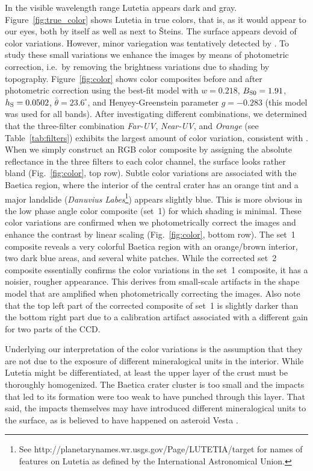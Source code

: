 \documentclass[3p,authoryear]{elsarticle}
\begin{document}
In the visible wavelength range Lutetia appears dark and gray. Figure~\ref{fig:true_color} shows Lutetia in true colors, that is, as it would appear to our eyes, both by itself as well as next to {\v S}teins. The surface appears devoid of color variations. However, minor variegation was tentatively detected by \citet{Mg12}. To study these small variations we enhance the images by means of photometric correction, i.e.\ by removing the brightness variations due to shading by topography. Figure~\ref{fig:color} shows color composites before and after photometric correction using the best-fit \citet{H02} model with $w = 0.218$, $B_{{\rm S}0} = 1.91$, $h_{\rm S} = 0.0502$, $\bar{\theta} = 23.6^\circ$, and Henyey-Greenstein parameter $g = -0.283$ (this model was used for all bands). After investigating different combinations, we determined that the three-filter combination {\it Far-UV}, {\it Near-UV}, and {\it Orange} (see Table~\ref{tab:filters}) exhibits the largest amount of color variation, consistent with \citet{Mg12}. When we simply construct an RGB color composite by assigning the absolute reflectance in the three filters to each color channel, the surface looks rather bland (Fig.~\ref{fig:color}, top row). Subtle color variations are associated with the Baetica region, where the interior of the central crater has an orange tint and a major landslide ({\it Danuvius Labes}\footnote{See http://planetarynames.wr.usgs.gov/Page/LUTETIA/target for names of features on Lutetia as defined by the International Astronomical Union.}) appears slightly blue. This is more obvious in the low phase angle color composite (set~1) for which shading is minimal. These color variations are confirmed when we photometrically correct the images and enhance the contrast by linear scaling (Fig.~\ref{fig:color}, bottom row). The set~1 composite reveals a very colorful Baetica region with an orange/brown interior, two dark blue areas, and several white patches. While the corrected set~2 composite essentially confirms the color variations in the set~1 composite, it has a noisier, rougher appearance. This derives from small-scale artifacts in the \citet{P12} shape model that are amplified when photometrically correcting the images. Also note that the top left part of the corrected composite of set~1 is slightly darker than the bottom right part due to a calibration artifact associated with a different gain for two parts of the CCD.

Underlying our interpretation of the color variations is the assumption that they are not due to the exposure of different mineralogical units in the interior. While Lutetia might be differentiated, at least the upper layer of the crust must be thoroughly homogenized. The Baetica crater cluster is too small and the impacts that led to its formation were too weak to have punched through this layer. That said, the impacts themselves may have introduced different mineralogical units to the surface, as is believed to have happened on asteroid Vesta \citep{McC12,Re12}.
\end{document}
